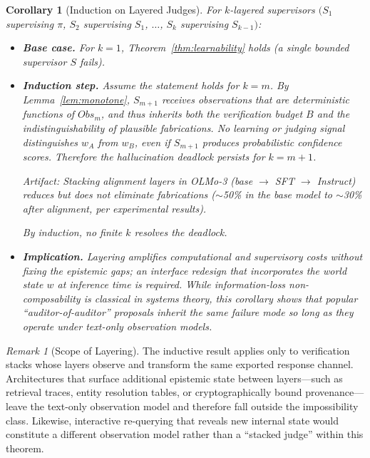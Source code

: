 \documentclass[11pt]{article}
\theoremstyle{definition}
\theoremstyle{plain}
\newtheorem{corollary}[theorem]{Corollary}
\theoremstyle{remark}
\newtheorem{remark}{Remark}[section]
\begin{document}
\begin{corollary}[Induction on Layered Judges]\label{cor:layered}
For $k$-layered supervisors $(S_1$ supervising $\pi$, $S_2$ supervising $S_1$, $\dots$, $S_k$ supervising $S_{k-1})$:

\begin{itemize}
  \item \textbf{Base case.} For $k=1$, Theorem~\ref{thm:learnability} holds (a single bounded supervisor $S$ fails).

  \item \textbf{Induction step.} Assume the statement holds for $k=m$. By Lemma~\ref{lem:monotone}, $S_{m+1}$ receives observations that are deterministic functions of $Obs_m$, and thus inherits both the verification budget $B$ and the indistinguishability of plausible fabrications. No learning or judging signal distinguishes $w_A$ from $w_B$, even if $S_{m+1}$ produces probabilistic confidence scores. Therefore the hallucination deadlock persists for $k=m+1$.

  Artifact: Stacking alignment layers in OLMo-3 (base $\to$ SFT $\to$ Instruct) reduces but does not eliminate fabrications ($\sim$50\% in the base model to $\sim$30\% after alignment, per experimental results).

  By induction, no finite $k$ resolves the deadlock.

  \item \textbf{Implication.} Layering amplifies computational and supervisory costs without fixing the epistemic gaps; an interface redesign that incorporates the world state $w$ at inference time is required. While information-loss non-composability is classical in systems theory, this corollary shows that popular ``auditor-of-auditor'' proposals inherit the same failure mode so long as they operate under text-only observation models.
\end{itemize}
\end{corollary}

\begin{remark}[Scope of Layering]
The inductive result applies only to verification stacks whose layers observe and transform the same exported response channel. Architectures that surface additional epistemic state between layers—such as retrieval traces, entity resolution tables, or cryptographically bound provenance—leave the text-only observation model and therefore fall outside the impossibility class. Likewise, interactive re-querying that reveals new internal state would constitute a different observation model rather than a ``stacked judge'' within this theorem.
\end{remark}
\end{document}
